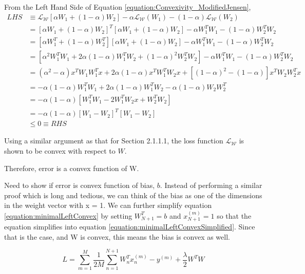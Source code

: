 \documentclass[a4paper,12pt]{article}
\begin{document}
From the Left Hand Side of Equation \ref{equation:Convexivity_ModifiedJensen},
\begin{align}
	LHS &\equiv \mathcal{L_W}[\alpha W_1 + (1 - \alpha) W_2 ] - 
    	\alpha \mathcal{L_W}(W_1) - (1 - \alpha) \mathcal{L_W}(W_2) \\
    &= [\alpha W_1 + (1 - \alpha) W_2]^{T} [\alpha W_1 + (1 - \alpha) W_2] 
    	- \alpha W_1^{T} W_1 - (1 - \alpha) W_2^{T} W_2 \\
    &= [\alpha W_1^{T} + (1 - \alpha) W_2^{T}] [\alpha W_1 + (1 - \alpha) W_2] 
    	- \alpha W_1^{T} W_1 - (1 - \alpha) W_2^{T} W_2 \\
    &= [\alpha^2 W_1^{T} W_1 + 2 \alpha (1 - \alpha) W_1^{T} W_2 + (1 - \alpha)^2 W_2^{T} W_2]
    	- \alpha W_1^{T} W_1 - (1 - \alpha) W_2^{T} W_2 \\
    &= (\alpha^2 - \alpha) x^{T} W_1 W_1^{T} x + 2 \alpha (1 - \alpha) x^{T} W_1^{T} W_2 x
    	+ [(1 - \alpha)^2 - (1 - \alpha)] x^{T} W_2 W_2^{T} x \\
    &= - \alpha (1 - \alpha) W_1^{T} W_1 + 2 \alpha (1 - \alpha) W_1^{T} W_2
    	- \alpha (1 - \alpha) W_2 W_2^{T}\\
    &= - \alpha (1 - \alpha) [ W_1^{T} W_1 - 2 W_1^{T} W_2 x + W_2^{T} W_2] \\
    \label{equation:Convexivity_LW} &= - \alpha (1 - \alpha) [W_1 - W_2]^{T} [W_1 - W_2] \\
    &\leq 0 \equiv RHS
\end{align}

Using a similar argument as that for Section 2.1.1.1, the loss function $\mathcal{L_W}$ is shown to be convex with respect to $W$. 

Therefore, error is a convex function of W. 

Need to show if error is convex function of bias, $b$. 
Instead of performing a similar proof which is long and tedious, 
we can think of the bias as one of the dimensions in the weight vector with x = 1. We can further simplify equation \ref{equation:minimalLeftConvex} by setting
$W^{T}_{N+1} = b$ and $x^{(m)}_{N+1} = 1$ so that the equation simplifies into equation \ref{equation:minimalLeftConvexSimplified}. 
Since that is the case, and W is convex, this means the bias is convex as well.

\begin{equation}
\label{equation:minimalLeftConvexSimplified}
L = \sum_{m=1}^{M} \frac{1}{2M} \sum_{n=1}^{N+1} W^{T}_{n}x^{(m)}_{n} - y^{(m)} + \frac{\lambda}{2} W^{T}W 
\end{equation}
\end{document}
